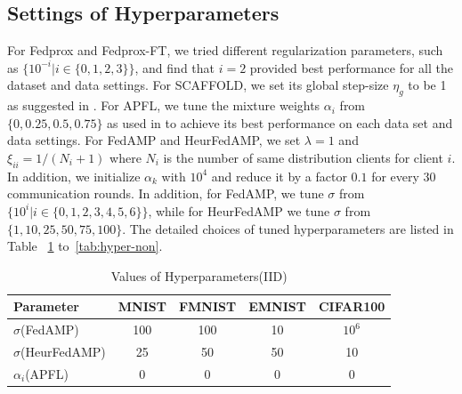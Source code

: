
\subsection{Settings of Hyperparameters}
For Fedprox and Fedprox-FT, we tried different regularization parameters, such as $\{10^{-i}|i \in \{0,1,2,3\}\}$, and find that $i=2$  provided best performance for all the dataset and data settings. 
For SCAFFOLD, we set its global step-size $\eta_g$ to be 1 as suggested in \cite{karimireddy2019scaffold}. 
For APFL, we tune the mixture weights $\alpha_i$ from $\{0, 0.25, 0.5, 0.75\}$ as used in \cite{deng2020adaptive} to achieve its best performance on each data set and data settings.
For {FedAMP} and {HeurFedAMP}, we set $\lambda=1$ and $\xi_{ii} = 1/(N_i +1)$  where $N_i$ is the number of same distribution clients for client $i$. In addition, we initialize $\alpha_k$ with $10^4$ and reduce it by a factor $0.1$ for every $30$ communication rounds. In addition, for FedAMP, we tune $\sigma$ from $\{10^i | i \in \{0,1,2,3,4,5,6\}\}$, while for HeurFedAMP we tune $\sigma$ from $\{1, 10, 25, 50, 75, 100\}$.
The detailed choices of tuned hyperparameters are listed in Table ~\ref{tab:hyper-IID} to~\ref{tab:hyper-non}.





\begin{table}[h!]
\setlength{\tabcolsep}{2pt}
\caption{Values of Hyperparameters(IID)}
\label{tab:hyper-IID}
\centering
\begin{tabular}{l|cccc} 
 \toprule
Parameter & MNIST & FMNIST & EMNIST & CIFAR100 \\ 
 \hline
$\sigma$({FedAMP}) & 100 & 100 & 10 & $10^6$	 \\
$\sigma$({HeurFedAMP}) & 25 & 50 & 50 &	 10\\
$\alpha_i$(APFL) & 0 & 0 & 0 & 0 \\
 \bottomrule
\end{tabular}
\end{table}

